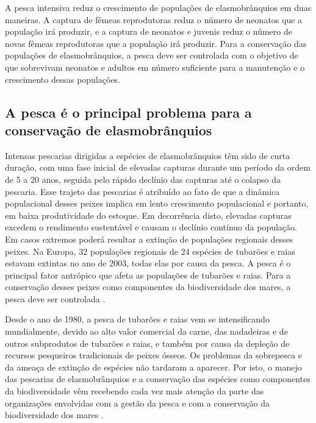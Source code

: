 \documentclass[a4paper,11pt,twoside,showtrims,onecolumn,openright,final]{memoir}
\begin{document}
A pesca intensiva reduz o crescimento de populações de elasmobrânquios em duas maneiras. 
A captura de fêmeas reprodutoras reduz o número de neonatos que a população irá produzir, 
e a captura de neonatos e juvenis reduz o número de novas fêmeas reprodutoras que a população 
irá produzir. Para a conservação das populações de elasmobrânquios, a pesca deve ser controlada 
com o objetivo de que sobrevivam neonatos e adultos em número suficiente para a manutenção e 
o crescimento dessas populações.

\subsection*{A pesca é o principal problema para a conservação de elasmobrânquios}

Intensas pescarias dirigidas a espécies de elasmobrânquios têm sido de curta duração, com uma fase 
inicial de elevadas capturas durante um período da ordem de 5 a 20 anos,  seguida pelo rápido declínio 
das capturas até o colapso da pescaria. Esse trajeto das pescarias é atribuído ao fato de que a dinâmica 
populacional desses peixes implica em lento crescimento populacional e portanto, em baixa produtividade do 
estoque. Em decorrência disto, elevadas capturas excedem o rendimento sustentável e causam o declínio 
contínuo da população. Em casos extremos poderá resultar a extinção de populações regionais desses peixes. 
Na Europa, 32 populações regionais de 24 espécies de tubarões e raias estavam extintas no ano de 2003, 
todas elas por causa da pesca. A pesca é o principal fator antrópico que afeta as populações de tubarões 
e raias. Para a conservação desses peixes como componentes da biodiversidade dos mares, a pesca deve ser 
controlada \citep{walker2004,camhi1998,dulvy2003,baum2003}. %

Desde o ano de 1980, a pesca de tubarões e raias vem se intensificando mundialmente, 
devido ao alto valor comercial da carne, das nadadeiras e de outros subprodutos de tubarões e raias, 
e também por causa da depleção de recursos pesqueiros tradicionais de peixes ósseos. Os problemas 
da sobrepesca e da ameaça de extinção de espécies não tardaram a aparecer. Por isto, o manejo das 
pescarias de elasmobrânquios e a conservação das espécies como componentes da biodiversidade vêm 
recebendo cada vez mais atenção da parte das organizações envolvidas com a gestão da pesca e com 
a conservação da biodiversidade dos mares \citep{camhi1998,castro1999,baum2003,miranda2003,musick2004}.
\end{document}
